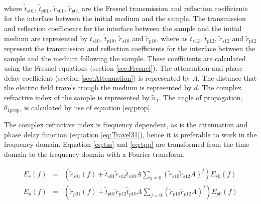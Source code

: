 where $\widetilde{t}_{s01}$, $\widetilde{t}_{p01}$, $\widetilde{r}_{s01}$, $\widetilde{r}_{p01}$ are the Fresnel transmission and reflection coefficients for the interface between the initial medium and the sample. The transmission and reflection coefficients for the interface between the sample and the initial medium are represented by $\widetilde{t}_{s10}$, $\widetilde{t}_{p10}$, $\widetilde{r}_{s10}$ and $\widetilde{r}_{p10}$, where as $\widetilde{t}_{s12}$, $\widetilde{t}_{p12}$, $\widetilde{r}_{s12}$ and $\widetilde{r}_{p12}$ represent the transmission and reflection coefficients for the interface between the sample and the medium following the sample. These coefficients are calculated using the Fresnel equations (section \ref{sec:Fresnel}). The attenuation and phase delay coefficient (section \ref{sec:Attenuation}) is represented by $A$. The distance that the electric field travels trough the medium is represented by $d$. The complex refractive index of the sample is represented by $\widetilde{n}_{1}$. The angle of propagation, $\theta_{1 prop}$, is calculated by use of equation \ref{eq:prop}.

The complex refractive index is frequency dependent, as is the attenuation and phase delay function (equation \ref{eq:Travel31}), hence it is preferable to work in the frequency domain. Equation \ref{eq:tss} and \ref{eq:tpp} are transformed from the time domain to the frequency domain with a Fourier transform.

\begin{eqnarray}
E_{s}(f) &=& (\widetilde{r}_{s01}(f) + \widetilde{t}_{s01}\widetilde{r}_{s12}\widetilde{t}_{s10}A\sum_{j=0}{(\widetilde{r}_{s10}\widetilde{r}_{s12}A)^{j}})E_{s0}(f)\label{eq:fss}\\
E_{p}(f) &=& (\widetilde{r}_{p01}(f) + \widetilde{t}_{p01}\widetilde{r}_{p12}\widetilde{t}_{p10}A\sum_{j=0}{(\widetilde{r}_{p10}\widetilde{r}_{p12}A)^{j}})E_{p0}(f)\label{eq:fpp}
\end{eqnarray}



